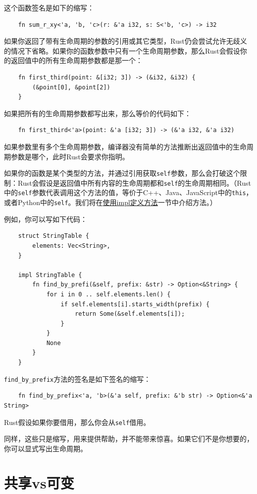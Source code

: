 这个函数签名是如下的缩写：
\begin{verbatim}
    fn sum_r_xy<'a, 'b, 'c>(r: &'a i32, s: S<'b, 'c>) -> i32
\end{verbatim}

如果你返回了带有生命周期的参数的引用或其它类型，Rust仍会尝试允许无歧义的情况下省略。如果你的函数参数中只有一个生命周期参数，那么Rust会假设你的返回值中的所有生命周期参数都是那一个：
\begin{verbatim}
    fn first_third(point: &[i32; 3]) -> (&i32, &i32) {
        (&point[0], &point[2])
    }
\end{verbatim}

如果把所有的生命周期参数都写出来，那么等价的代码如下：
\begin{verbatim}
    fn first_third<'a>(point: &'a [i32; 3]) -> (&'a i32, &'a i32)
\end{verbatim}

如果参数里有多个生命周期参数，编译器没有简单的方法推断出返回值中的生命周期参数是哪个，此时Rust会要求你指明。

如果你的函数是某个类型的方法，并通过引用获取\texttt{self}参数，那么会打破这个限制：Rust会假设是返回值中所有内容的生命周期都和\texttt{self}的生命周期相同。（Rust中的\texttt{self}参数代表调用这个方法的值，等价于C++、Java、JavaScript中的\texttt{this}，或者Python中的\texttt{self}。我们将在\hyperref[method]{使用impl定义方法}一节中介绍方法。）

例如，你可以写如下代码：
\begin{verbatim}
    struct StringTable {
        elements: Vec<String>,
    }

    impl StringTable {
        fn find_by_prefi(&self, prefix: &str) -> Option<&String> {
            for i in 0 .. self.elements.len() {
                if self.elements[i].starts_width(prefix) {
                    return Some(&self.elements[i]);
                }
            }
            None
        }
    }
\end{verbatim}

\texttt{find\_by\_prefix}方法的签名是如下签名的缩写：
\begin{verbatim}
    fn find_by_prefix<'a, 'b>(&'a self, prefix: &'b str) -> Option<&'a String>
\end{verbatim}
Rust假设如果你要借用，那么你会从\texttt{self}借用。

同样，这些只是缩写，用来提供帮助，并不能带来惊喜。如果它们不是你想要的，你可以显式写出生命周期。

\section{共享vs可变}\label{ShareVSMut}

